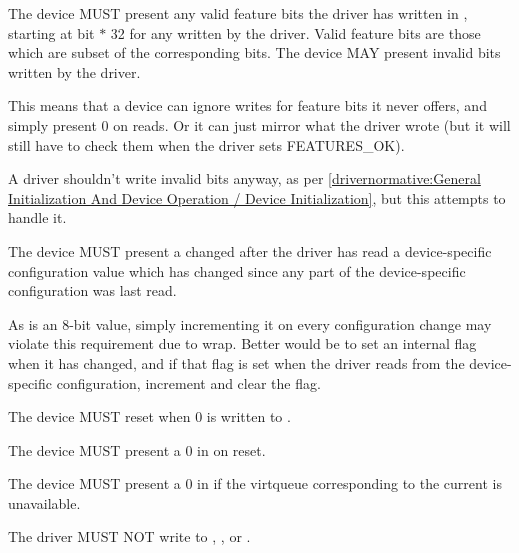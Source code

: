 The device MUST present any valid feature bits the driver has written in , starting at bit  $*$ 32 for any  written by the driver.  Valid feature bits are those which are subset of the corresponding  bits.  The device MAY present invalid bits written by the driver.

\begin{note}
  This means that a device can ignore writes for feature bits it never
  offers, and simply present 0 on reads.  Or it can just mirror what the driver wrote
  (but it will still have to check them when the driver sets FEATURES_OK).
\end{note}

\begin{note}
  A driver shouldn't write invalid bits anyway, as per \ref{drivernormative:General Initialization And Device Operation / Device Initialization}, but this attempts to handle it.
\end{note}

The device MUST present a changed  after the
driver has read a device-specific configuration value which has
changed since any part of the device-specific configuration was last
read.
\begin{note}
As  is an 8-bit value, simply incrementing it
on every configuration change may violate this requirement due to wrap.
Better would be to set an internal flag when it has changed,
and if that flag is set when the driver reads from the device-specific
configuration, increment  and clear the flag.
\end{note}

The device MUST reset when 0 is written to .

The device MUST present a 0 in  on reset.

The device MUST present a 0 in  if the virtqueue
corresponding to the current  is unavailable.


The driver MUST NOT write to , ,  or .


